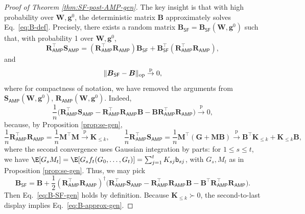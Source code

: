 \documentclass[]{article}
\def\op{{\rm op}}
\def\bR{{\boldsymbol R}}
\def\sb{{\mathsf b}}
\def\bW{{\boldsymbol W}}
\def\bM{{\boldsymbol M}}
\def\bS{\boldsymbol{S}}
\def\bB{{\boldsymbol B}}
\def\bg{{\boldsymbol g}}
\def\bW{{\boldsymbol W}}
\def\bG{{\boldsymbol G}}
\def\bg{{\boldsymbol g}}
\def\bK{\boldsymbol{K}}
\def\pconv{\stackrel{\mathrm{p}}\rightarrow}
\def\AMP{\mathsf{AMP}}
\def\SF{\mathsf{SF}}
\begin{document}
\begin{proof}[Proof of Theorem \ref{thm:SF-post-AMP-gen}]
    The key insight is that with high probability over $\bW,\bg^0$, 
    the deterministic matrix $\bB$ approximately solves Eq.~\eqref{eq:B-def}.
    Precisely,
    there exists a random matrix $\bB_{\SF} = \bB_{\SF}(\bW,\bg^0)$
    such that,
    with probability 1 over $\bW,\bg^0$,
    \begin{equation}
    \label{eq:B-SF-gen}
        \bR_{\AMP}^\top \bS_{\AMP}
            =
            (\bR_{\AMP}^\top \bR_{\AMP})\bB_{\SF}
            + 
            \bB_{\SF}^\top (\bR_{\AMP}^\top \bR_{\AMP}),
    \end{equation}
    and 
    \begin{equation}
    \label{eq:B-approx-gen}
        \| \bB_{\SF} - \bB \|_{\op} \pconv 0,
    \end{equation}
    where for compactness of notation,
    we have removed the arguments from $\bS_{\AMP}(\bW,\bg^0)$, $\bR_{\AMP}(\bW,\bg^0)$.
    Indeed,
    \begin{equation}
    \label{eq:R-S-conv}
        \frac1n
        \Big(
            \bR_{\AMP}^\top \bS_{\AMP} 
            - \bR_{\AMP}^\top \bR_{\AMP} \bB 
            - \bB \bR_{\AMP}^\top \bR_{\AMP}
        \Big)
        \pconv 0,
    \end{equation}
    because, by Proposition \ref{prop:se-gen},
    \begin{equation}
        \frac1n \bR_{\AMP}^\top \bR_{\AMP} 
            =
            \frac1n \bM^\top \bM \pconv \bK_{\leq k},
        \qquad 
        \frac1n \bR_{\AMP}^\top \bS_{\AMP}
            =
            \frac1n \bM^\top (\bG + \bM \bB)
            \pconv \bB^\top \bK_{\leq k} + \bK_{\leq k} \bB,
    \end{equation}
    where the second convergence uses Gaussian integration by parts: for $1 \leq s \leq t$,
    we have $\E[G_s M_t] = \E[G_s f_t(G_0,\ldots,G_t)] = \sum_{j=1}^t K_{sj}\sb_{sj}$,
    with $G_s,M_t$ as in Proposition \ref{prop:se-gen}.
    Thus,
    we may pick 
    \begin{equation}
        \bB_{\SF} 
            =
            \bB
                + 
                \frac12 (\bR_{\AMP}^\top \bR_{\AMP})^\dagger 
                \Big(
                    \bR_{\AMP}^\top \bS_{\AMP}
                    - 
                    \bR_{\AMP}^\top \bR_{\AMP} \bB
                    -
                    \bB^\top \bR_{\AMP}^\top \bR_{\AMP}
                \Big).
    \end{equation}
    Then Eq.~\eqref{eq:B-SF-gen} holds by definition.
    Because $\bK_{\leq k} \succ 0$,
    the second-to-last display implies Eq.~\eqref{eq:B-approx-gen}.


\end{proof}
\end{document}
